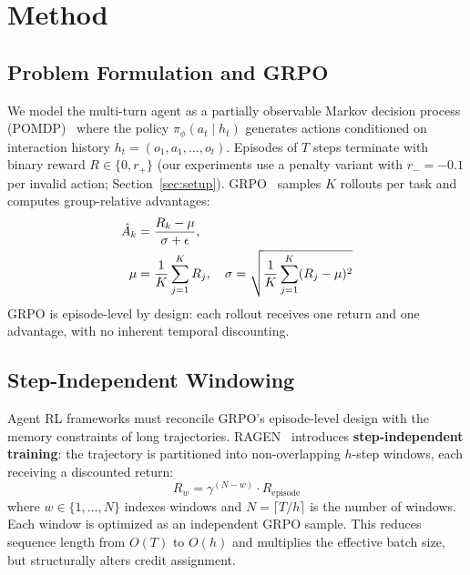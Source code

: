 \section{Method}
\label{sec:method}

\subsection{Problem Formulation and GRPO}
\label{sec:problem_formulation}

We model the multi-turn agent as a partially observable Markov decision process (POMDP)~\citep{kaelbling1998planning} where the policy $\pi_\phi(a_t \mid h_t)$ generates actions conditioned on interaction history $h_t = (o_1, a_1, \ldots, o_t)$. Episodes of $T$ steps terminate with binary reward $R \in \{0, r_+\}$ (our experiments use a penalty variant with $r_- = -0.1$ per invalid action; Section~\ref{sec:setup}). GRPO~\citep{shao2024deepseekmath} samples $K$ rollouts per task and computes group-relative advantages:
\begin{align}
\hat{A}_k &= \frac{R_k - \mu}{\sigma + \epsilon}, \notag \\
\mu &= \frac{1}{K}\sum_{j=1}^K R_j, \quad \sigma = \sqrt{\frac{1}{K}\sum_{j=1}^K (R_j - \mu)^2}
\label{eq:grpo_advantage}
\end{align}
GRPO is episode-level by design: each rollout receives one return and one advantage, with no inherent temporal discounting.

\subsection{Step-Independent Windowing}
\label{sec:step_independent}

Agent RL frameworks must reconcile GRPO's episode-level design with the memory constraints of long trajectories. RAGEN~\citep{ragen2025} introduces \textbf{step-independent training}: the trajectory is partitioned into non-overlapping $h$-step windows, each receiving a discounted return:
\begin{equation}
R_w = \gamma^{(N - w)} \cdot R_{\text{episode}}
\label{eq:step_return}
\end{equation}
where $w \in \{1, \ldots, N\}$ indexes windows and $N = \lceil T/h \rceil$ is the number of windows. Each window is optimized as an independent GRPO sample. This reduces sequence length from $O(T)$ to $O(h)$ and multiplies the effective batch size, but structurally alters credit assignment.

